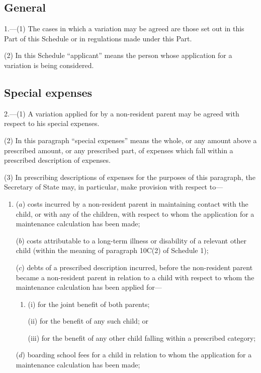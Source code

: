 \documentclass[a4paper]{article}
\begin{document}
{\subsection*{General}

1.—(1) The cases in which a variation may be agreed are those set out in this Part of this Schedule or in regulations made under this Part.

(2) In this Schedule “applicant” means the person whose application for a
variation is being considered.

\subsection*{Special expenses}

2.—(1) A variation applied for by a non-resident parent may be agreed with respect to his special expenses.

(2) In this paragraph “special expenses” means the whole, or any amount above a prescribed amount, or any prescribed part, of expenses which fall within a prescribed description of expenses.

(3) In prescribing descriptions of expenses for the purposes of this paragraph, the Secretary of State may, in particular, make provision with respect to---
\begin{enumerate}\item[]
($a$) costs incurred by a non-resident parent in maintaining contact with the child, or with any of the children, with respect to whom the application for a maintenance calculation has been made;

($b$) costs attributable to a long-term illness or disability of a relevant other child (within the meaning of paragraph 10C(2) of Schedule 1);

($c$) debts of a prescribed description incurred, before the non-resident parent became a non-resident parent in relation to a child with respect to whom the maintenance calculation has been applied for---
\begin{enumerate}\item[]
(i)
for the joint benefit of both parents;

(ii)
for the benefit of any such child; or

(iii) for the benefit of any other child falling within a prescribed category;
\end{enumerate}

($d$) boarding school fees for a child in relation to whom the application for a maintenance calculation has been made;


\end{enumerate}}
\end{document}
